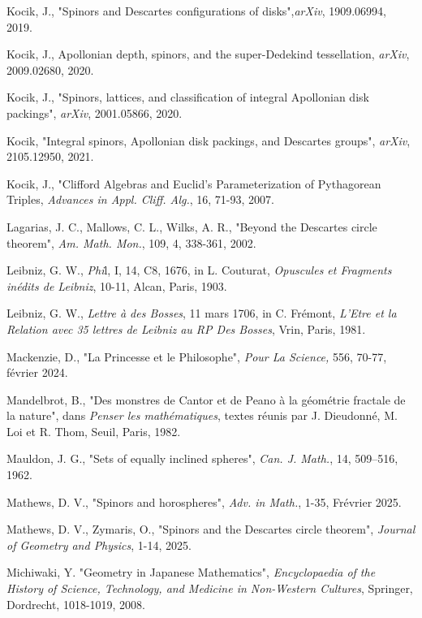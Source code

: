 \documentclass[12pt]{article}
\theoremstyle{définition}
\theoremstyle{remark}
\theoremstyle{plain}
\theoremstyle{plain}
\begin{document}
\begin{thebibliography}{}
 Kocik, J., "Spinors and Descartes configurations of disks",{\it  arXiv}, 1909.06994, 2019.

 Kocik, J., Apollonian depth, spinors, and the super-Dedekind tessellation, {\it arXiv}, 2009.02680, 2020.

 Kocik, J., "Spinors, lattices, and classification of integral Apollonian disk packings", {\it arXiv}, 2001.05866, 2020.

 Kocik, "Integral spinors, Apollonian disk packings, and Descartes groups", {\it arXiv}, 2105.12950, 2021.

 Kocik, J., "Clifford Algebras and Euclid’s Parameterization of Pythagorean Triples, {\it Advances in Appl. Cliff. Alg.}, 16, 71-93, 2007.

 Lagarias, J. C., Mallows, C. L., Wilks, A. R., "Beyond the Descartes circle theorem", {\it Am. Math. Mon.}, 109, 4, 338-361, 2002.

 Leibniz, G. W., {\it Phi}l, I, 14, C8, 1676, in L. Couturat, {\it Opuscules et Fragments inédits de Leibniz}, 10-11, Alcan, Paris, 1903.

 Leibniz, G. W., {\it Lettre à des Bosses}, 11 mars 1706, in C. Frémont, {\it L’Etre et la Relation avec 35 lettres de Leibniz au RP Des Bosses}, Vrin, Paris, 1981.

 Mackenzie, D., "La Princesse et le Philosophe", {\it Pour La Science,} 556, 70-77, février 2024.

 Mandelbrot, B., "Des monstres de Cantor et de Peano à la géométrie fractale de la nature", dans {\it Penser les mathématiques}, textes réunis par J. Dieudonné, M. Loi et R. Thom, Seuil, Paris, 1982.

 Mauldon, J. G., "Sets of equally inclined spheres", {\it Can. J. Math.}, 14, 509–516, 1962.

 Mathews, D. V., "Spinors and horospheres", {\it Adv. in Math.}, 1-35, Frévrier 2025.

 Mathews, D. V., Zymaris, O., "Spinors and the Descartes circle theorem",
{\it Journal of Geometry and Physics}, 1-14, 2025.

 Michiwaki, Y. "Geometry in Japanese Mathematics", {\it Encyclopaedia of the History of Science, Technology, and Medicine in Non-Western Cultures},
Springer, Dordrecht, 1018-1019, 2008.


\end{thebibliography}
\end{document}
